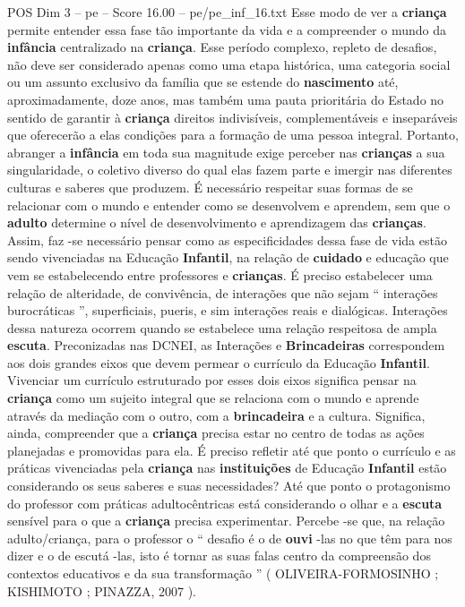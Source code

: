 \begin{textsample}{POS Dim 3 – pe – Score 16.00 – pe/pe\_inf\_16.txt}
Esse modo de ver a \textbf{criança} permite entender essa fase tão importante da vida e a compreender o mundo da \textbf{infância} centralizado na \textbf{criança}.
Esse período complexo, repleto de desafios, não deve ser considerado apenas como uma etapa histórica, uma categoria social ou um assunto exclusivo da família que se estende do \textbf{nascimento} até, aproximadamente, doze anos, mas também uma pauta prioritária do Estado no sentido de garantir à \textbf{criança} direitos indivisíveis, complementáveis e inseparáveis que oferecerão a elas condições para a formação de uma pessoa integral.
Portanto, abranger a \textbf{infância} em toda sua magnitude exige perceber nas \textbf{crianças} a sua singularidade, o coletivo diverso do qual elas fazem parte e imergir nas diferentes culturas e saberes que produzem.
É necessário respeitar suas formas de se relacionar com o mundo e entender como se desenvolvem e aprendem, sem que o \textbf{adulto} determine o nível de desenvolvimento e aprendizagem das \textbf{crianças}.
Assim, faz -se necessário pensar como as especificidades dessa fase de vida estão sendo vivenciadas na Educação \textbf{Infantil}, na relação de \textbf{cuidado} e educação que vem se estabelecendo entre professores e \textbf{crianças}.
É preciso estabelecer uma relação de alteridade, de convivência, de interações que não sejam “ interações burocráticas ”, superficiais, pueris, e sim interações reais e dialógicas.
Interações dessa natureza ocorrem quando se estabelece uma relação respeitosa de ampla \textbf{escuta}.
Preconizadas nas DCNEI, as Interações e \textbf{Brincadeiras} correspondem aos dois grandes eixos que devem permear o currículo da Educação \textbf{Infantil}.
Vivenciar um currículo estruturado por esses dois eixos significa pensar na \textbf{criança} como um sujeito integral que se relaciona com o mundo e aprende através da mediação com o outro, com a \textbf{brincadeira} e a cultura.
Significa, ainda, compreender que a \textbf{criança} precisa estar no centro de todas as ações planejadas e promovidas para ela.
É preciso refletir até que ponto o currículo e as práticas vivenciadas pela \textbf{criança} nas \textbf{instituições} de Educação \textbf{Infantil} estão considerando os seus saberes e suas necessidades?
Até que ponto o protagonismo do professor com práticas adultocêntricas está considerando o olhar e a \textbf{escuta} sensível para o que a \textbf{criança} precisa experimentar.
Percebe -se que, na relação adulto/criança, para o professor o “ desafio é o de \textbf{ouvi} -las no que têm para nos dizer e o de escutá -las, isto é tornar as suas falas centro da compreensão dos contextos educativos e da sua transformação ” ( OLIVEIRA-FORMOSINHO ; KISHIMOTO ; PINAZZA, 2007 ).

\end{textsample}
